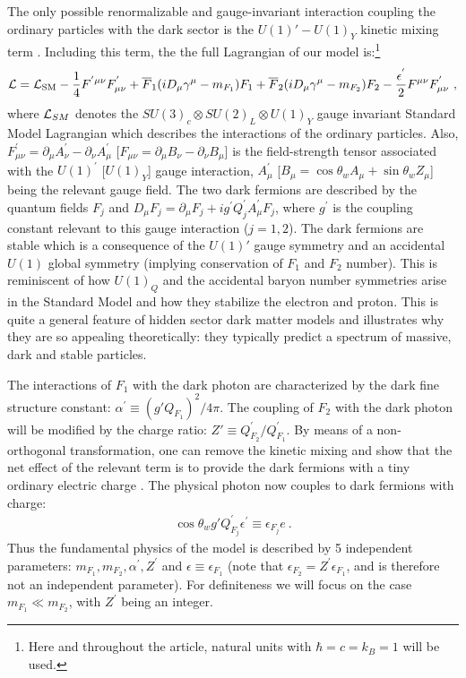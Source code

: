 \documentclass[12pt]{article}
\begin{document}
The only possible renormalizable and gauge-invariant interaction 
coupling the ordinary particles with the dark sector is the $U(1)' -
U(1)_Y$ kinetic mixing
term \cite{foothe}. Including this term, the 
the full Lagrangian of our model is:\footnote{Here and throughout the
article, natural units with $\hbar = c = k _B = 1$ will be used.}
%
\begin{eqnarray}
{\cal L} = {\cal L} _{\text{SM}} -\frac{1}{4}F ^{'\mu \nu} F _{\mu \nu}
^{'} + \overline{F} _1(iD _{\mu}\gamma ^{\mu} - m _{F_1})F _1 +
\overline{F} _2(iD _{\mu}\gamma ^{\mu} - m _{F_2})F _2 - \frac{\epsilon
^{'}}{2}F ^{\mu \nu} F _{\mu \nu} ^{'} \ ,
\end{eqnarray}
%
where ${\cal L}_{SM}$ denotes the $SU(3)_c \otimes SU(2)_L \otimes
U(1)_Y$ gauge invariant Standard Model Lagrangian which describes
the interactions of the ordinary particles.
Also, $F _{\mu \nu} ^{'} = \partial _{\mu} A _{\nu} ^{'} - \partial
_{\nu} A _{\mu} ^{'}$ 
[$F _{\mu \nu}  = \partial _{\mu} B _{\nu}  - \partial _{\nu} B _{\mu}
$] 
is the field-strength tensor 
associated with the $U(1) ^{'}$ [$U(1)_Y$] gauge interaction, $A _{\mu}
^{'}$ [$B_{\mu} = \cos\theta_w A_\mu + \sin\theta_w Z_\mu$]
being the relevant gauge field. 
The two dark fermions are described by the quantum fields $F_j$ and $D
_{\mu}F _j = \partial _{\mu}F _j + ig ^{'}Q _{j} ^{'} A _{\mu} ^{'}F
_j$, where $g ^{'}$ is the coupling constant relevant to this gauge
interaction ($j=1,2$). The dark fermions are stable which is a
consequence of the $U(1)'$
gauge symmetry and an accidental $U(1)$ global symmetry  (implying
conservation of $F_1$ and $F_2$ number). This is reminiscent of how
$U(1)_Q$ and the accidental baryon number  symmetries arise in the
Standard Model and how they stabilize the electron and proton. This is
quite a general feature of hidden sector dark matter models and
illustrates why they are so appealing theoretically: they typically
predict a spectrum of massive, dark and stable particles.

The interactions of $F _1$ with the dark photon are characterized by the
dark fine structure constant: $\alpha ^{'} \equiv (g'Q _{F_1}) ^2/4\pi$.
The coupling of $F _2$ with the dark photon will be modified by the
charge ratio: $Z' \equiv Q _{F_2} ^{'}/Q _{F_1} ^{'}$. By means of a
non-orthogonal transformation, one can remove the kinetic mixing and
show that the net effect of the relevant term is to provide the dark
fermions with a tiny ordinary electric charge \cite{holdom}. The
physical photon now couples to dark fermions with charge:
%
\begin{eqnarray}
\cos\theta_w g'Q _{F_j} ^{'} \epsilon ^{'} \equiv \epsilon _{F_j}e \ .
\end{eqnarray}
%
Thus the fundamental physics of the model is described by 5 independent
parameters: $m _{F_1},m _{F_2},\alpha ^{'},Z ^{'}$ and $\epsilon \equiv
\epsilon _{F_1}$ (note that $\epsilon _{F_2} = Z ^{'}\epsilon _{F_1}$,
and is therefore not an independent parameter). For definiteness we will
focus on the case $m _{F_1} \ll m _{F_2}$, with $Z ^{'}$ being an
integer.
\end{document}
